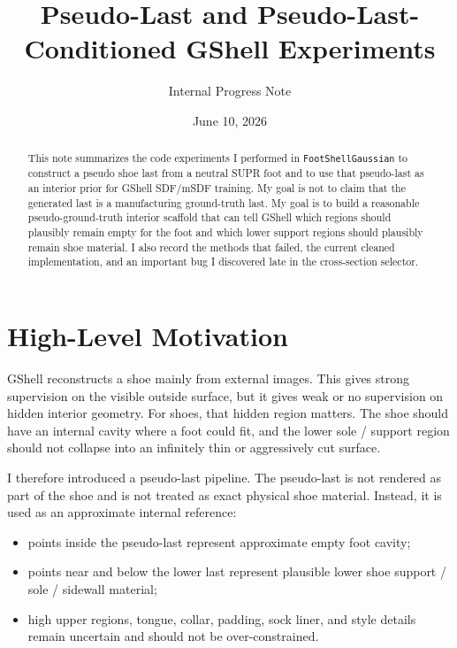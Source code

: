 \documentclass[11pt]{article}
\title{Pseudo-Last and Pseudo-Last-Conditioned GShell Experiments}
\author{Internal Progress Note}
\date{June 10, 2026}
\begin{document}
\maketitle

\begin{abstract}
This note summarizes the code experiments I performed in
\texttt{FootShellGaussian} to construct a pseudo shoe last from a neutral SUPR
foot and to use that pseudo-last as an interior prior for GShell SDF/mSDF
training.  My goal is not to claim that the generated last is a manufacturing
ground-truth last.  My goal is to build a reasonable pseudo-ground-truth
interior scaffold that can tell GShell which regions should plausibly remain
empty for the foot and which lower support regions should plausibly remain
shoe material.  I also record the methods that failed, the current cleaned
implementation, and an important bug I discovered late in the cross-section
selector.
\end{abstract}

\tableofcontents
\newpage

\section{High-Level Motivation}

GShell reconstructs a shoe mainly from external images.  This gives strong
supervision on the visible outside surface, but it gives weak or no supervision
on hidden interior geometry.  For shoes, that hidden region matters.  The shoe
should have an internal cavity where a foot could fit, and the lower sole /
support region should not collapse into an infinitely thin or aggressively cut
surface.

I therefore introduced a pseudo-last pipeline.  The pseudo-last is
not rendered as part of the shoe and is not treated as exact physical shoe
material.  Instead, it is used as an approximate internal reference:
\begin{itemize}
    \item points inside the pseudo-last represent approximate empty foot cavity;
    \item points near and below the lower last represent plausible lower shoe
    support / sole / sidewall material;
    \item high upper regions, tongue, collar, padding, sock liner, and style
    details remain uncertain and should not be over-constrained.
\end{itemize}
\end{document}
